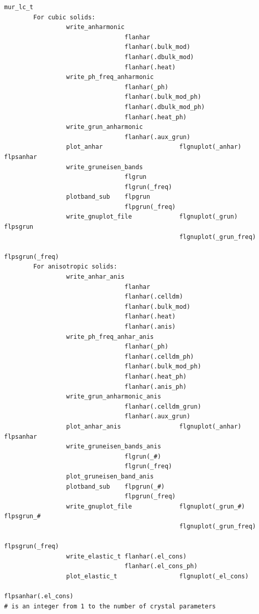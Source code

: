 \documentclass[12pt,a4paper]{article}
\begin{document}
\begin{verbatim}
mur_lc_t        
        For cubic solids: 
                 write_anharmonic
                                 flanhar
                                 flanhar(.bulk_mod)
                                 flanhar(.dbulk_mod)
                                 flanhar(.heat)
                 write_ph_freq_anharmonic
                                 flanhar(_ph)
                                 flanhar(.bulk_mod_ph)
                                 flanhar(.dbulk_mod_ph)
                                 flanhar(.heat_ph)
                 write_grun_anharmonic
                                 flanhar(.aux_grun)
                 plot_anhar                     flgnuplot(_anhar)   flpsanhar
                 write_gruneisen_bands
                                 flgrun
                                 flgrun(_freq)
                 plotband_sub    flpgrun
                                 flpgrun(_freq)
                 write_gnuplot_file             flgnuplot(_grun)    flpsgrun
                                                flgnuplot(_grun_freq) 
                                                                 flpsgrun(_freq)
        For anisotropic solids:
                 write_anhar_anis
                                 flanhar
                                 flanhar(.celldm)
                                 flanhar(.bulk_mod)
                                 flanhar(.heat)
                                 flanhar(.anis)
                 write_ph_freq_anhar_anis
                                 flanhar(_ph)
                                 flanhar(.celldm_ph)
                                 flanhar(.bulk_mod_ph)
                                 flanhar(.heat_ph)
                                 flanhar(.anis_ph)
                 write_grun_anharmonic_anis
                                 flanhar(.celldm_grun)
                                 flanhar(.aux_grun)
                 plot_anhar_anis                flgnuplot(_anhar)   flpsanhar
                 write_gruneisen_bands_anis
                                 flgrun(_#)
                                 flgrun(_freq)
                 plot_gruneisen_band_anis
                 plotband_sub    flpgrun(_#)
                                 flpgrun(_freq)
                 write_gnuplot_file             flgnuplot(_grun_#)   flpsgrun_#
                                                flgnuplot(_grun_freq) 
                                                                 flpsgrun(_freq)
                 write_elastic_t flanhar(.el_cons)
                                 flanhar(.el_cons_ph)
                 plot_elastic_t                 flgnuplot(_el_cons)  
                                                           flpsanhar(.el_cons)
# is an integer from 1 to the number of crystal parameters
\end{verbatim} 
\end{document}
